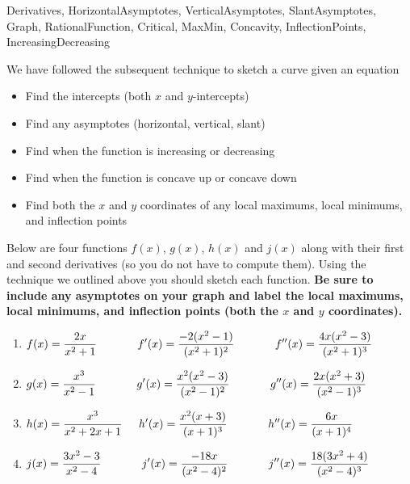 \begin{tagblock}{Derivatives, HorizontalAsymptotes, VerticalAsymptotes, SlantAsymptotes, Graph, RationalFunction, Critical, MaxMin, Concavity, InflectionPoints, IncreasingDecreasing  }

\begin{question}

We have followed the subsequent technique to sketch a curve given an equation
\begin{itemize}
\item Find the intercepts (both $x$ and $y$-intercepts)
\item Find any asymptotes (horizontal, vertical, slant)
\item Find when the function is increasing or decreasing
\item Find when the function is concave up or concave down
\item Find both the $x$ and $y$ coordinates of any local maximums, local minimums, and inflection points
\end{itemize}

Below are four functions  $f(x)$, $g(x)$, $h(x)$ and $j(x)$ along with their first and second derivatives (so you do not have to compute them).  Using the technique we outlined above you should sketch each function.  \textbf{Be sure to include any asymptotes on your graph and label the local maximums, local minimums, and inflection points (both the $x$ and $y$ coordinates).}  



\begin{enumerate}  
\item $\displaystyle f(x) = \frac{2x}{x^2+1} \hspace{.5in} f'(x) = \frac{-2(x^2-1)}{(x^2+1)^2} \hspace{.5in} f''(x) = \frac{4x(x^2-3)}{(x^2+1)^3} $
\item  $\displaystyle  g(x) = \frac{x^3}{x^2-1} \hspace{.5in} g'(x) = \frac{x^2(x^2-3)}{(x^2-1)^2} \hspace{.5in} g''(x) = \frac{2x(x^2+3)}{(x^2-1)^3} $
\item $\displaystyle h(x) =  \frac{x^3}{x^2+2x+1} \hspace{.2in} h'(x) = \frac{x^2(x+3)}{(x+1)^3} \hspace{.5in}  h''(x) = \frac{6x}{(x+1)^4} $
\item $\displaystyle  j(x) = \frac{3x^2-3}{x^2-4} \hspace{.5in} j'(x) = \frac{-18x}{(x^2-4)^2} \hspace{.5in} j''(x) = \frac{18(3x^2+4)}{(x^2-4)^3} $



\end{enumerate}
\end{question}
\end{tagblock}
